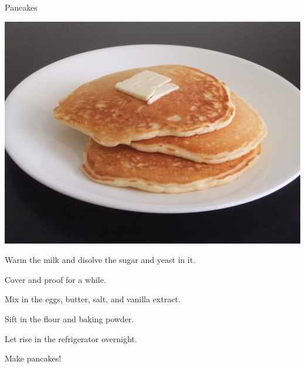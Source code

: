 \documentclass{recipe}
\begin{document}
\begin{recipe}{Pancakes}

  \begin{ingredients}
  \end{ingredients}

  \begin{images}
    \begin{image}
      \includegraphics[width=\linewidth,trim=0px 0px 0px 0px, clip=true]{pancakes-01.jpeg}
    \end{image}
  \end{images}

  \begin{steps}
  \item Warm the milk and disolve the sugar and yeast in it.
  \item Cover and proof for a while.
  \item Mix in the eggs, butter, salt, and vanilla extract.
  \item Sift in the flour and baking powder.
  \item Let rise in the refrigerator overnight.
  \item Make pancakes!
  \end{steps}
\end{recipe}
\end{document}
